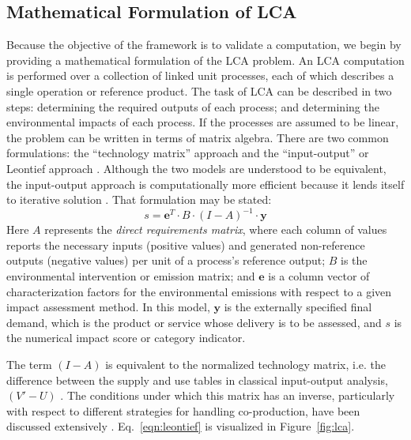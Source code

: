 \subsection{Mathematical Formulation of LCA}

Because the objective of the framework is to validate a computation, we begin by providing a mathematical formulation of the LCA problem.  An LCA computation is performed over a collection of linked unit processes, each of which describes a single operation or reference product.  The task of LCA can be described in two steps: determining the required outputs of each process; and determining the environmental impacts of each process.  If the processes are assumed to be linear, the problem can be written in terms of matrix algebra.  There are two common formulations: the ``technology matrix'' approach and the ``input-output'' or Leontief approach \citep{Suh_2002, Pauliuk_2015}.  Although the two models are understood to be equivalent, the input-output approach is computationally more efficient because it lends itself to iterative solution \citep{Peters_2007}.  That formulation may be stated:
\begin{equation}
s = \mathbf{e}^T \cdot B \cdot \left(I - A\right)^{-1} \cdot \mathbf{y}
\label{eqn:leontief}
\end{equation}
Here $A$ represents the \emph{direct requirements matrix}, where each column of values reports the necessary inputs (positive values) and generated non-reference outputs (negative values) per unit of a process's reference output; $B$ is the environmental intervention or emission matrix; and $\mathbf{e}$ is a column vector of characterization factors for the environmental emissions with respect to a given impact assessment method.  In this model, $\mathbf{y}$ is the externally specified final demand, which is the product or service whose delivery is to be assessed, and $s$ is the numerical impact score or category indicator.  

The term $(I-A)$ is equivalent to the normalized technology matrix, i.e. the difference between the supply and use tables in classical input-output analysis, $(V'-U)$ \citep{Suh_2010}.  The conditions under which this matrix has an inverse, particularly with respect to different strategies for handling co-production, have been discussed extensively \citep{Suh_2010, Majeau_Bettez_2014}.  Eq.~\ref{eqn:leontief} is visualized in Figure~\ref{fig:lca}. 


